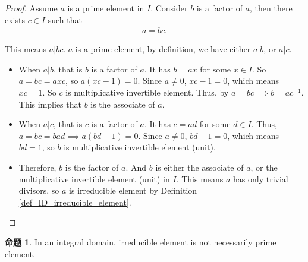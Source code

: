 \documentclass[utf8]{ctexbook}
\theoremstyle{definition}
\newtheorem{protoproposition}{命题}[section]
\newenvironment{proposition}
   {\colorlet{shadecolor}{green!15}\begin{shaded}\begin{protoproposition}}
   {\end{protoproposition}\end{shaded}}
\begin{document}
\begin{proof}
Assume $a$ is a prime element in $I$. Consider $b$ is a factor of $a$, then there exists $c \in I$ such that
\begin{align*}
a = bc .
\end{align*}

This means $a | bc $. $a$ is a prime element, by definition, we have either $a | b$, or $a | c $.
\begin{itemize}
\item{When $ a | b$, that is $b$ is a factor of $a$. It has $b = a x$ for some $x \in I$. So $a = b c = a x c$, so $a (x c - 1) =0$. Since $a \neq 0$, $xc - 1 = 0$, which means $xc = 1$. So $c$ is multiplicative invertible element. Thus, by $a = bc \implies b = a c^{-1}$. This implies that $b$ is the associate of $a$.}
\item{When $a | c$, that is $c $ is a factor of $a$. It has $c = ad$ for some $d \in I$. Thus, $a = bc = b ad \implies a (bd - 1) =0$. Since $a \neq 0 $, $bd-1=0$, which means $bd = 1$, so $b$ is multiplicative invertible element (unit).}
\item{Therefore, $b$ is the factor of $a$. And $b$ is either the associate of $a$, or the multiplicative invertible element (unit) in $I$. This means $a$ has only trivial divisors, so $a$ is irreducible element by Definition \ref{def_ID_irreducible_element}. }
\end{itemize}
\end{proof}


\begin{proposition}\label{proposition_ID_irreducible_not_prime}
In an integral domain, irreducible element is not necessarily prime element.
\end{proposition}
\end{document}
